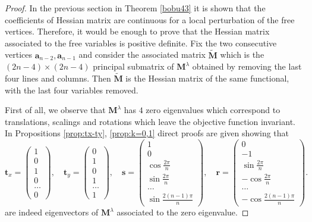 \documentclass[11pt]{article}
\numberwithin{equation}{section}\newtheorem*{jepEnonce}{\jepEnonceTitle}\newenvironment{enonce*}[1]{\def\jepEnonceTitle{#1}\jepEnonce}{\endjepEnonce}\newtheorem*{conj*}{Conjecture}
\theoremstyle{plain}
\theoremstyle{definition}
\newcommand{\bo}[1]{{\boldsymbol#1}}
\begin{document}
\begin{proof} In the previous section in Theorem \ref{bobu43} it is shown that the coefficients of Hessian matrix are continuous for a local perturbation of the free vertices. Therefore, it would be enough to prove that the Hessian matrix associated to the free variables is positive definite. Fix the two consecutive vertices $\bo a_{n-2},\bo a_{n-1}$ and consider the associated matrix $\widetilde{\bo{M}}$ which is the $(2n-4)\times(2n-4)$ principal submatrix of $\bo M^\lambda$ obtained by removing the last four lines and columns. Then $\widetilde{\bo{M}}$ is the Hessian matrix of the same functional, with the last four variables removed.

First of all, we observe that $\bo M^\lambda$ has $4$ zero eigenvalues which correspond to translations, scalings and rotations which leave the objective function invariant. In Propositions \ref{prop:tx-ty}, \ref{prop:k=0,1} direct proofs are given showing that
\begin{equation}\bo t_x= \begin{pmatrix} 1\\0\\1\\0\\ \dots\\0\end{pmatrix},\quad \bo t_y= \begin{pmatrix} 0\\1\\0\\1\\ \dots\\1 \end{pmatrix},\quad \bo s=\begin{pmatrix} 1\\ 0\\ \cos\frac {2\pi}{n} \\ \sin\frac {2\pi}{n}\\ \dots\\\sin \frac{2(n-1) \pi}{n} \end{pmatrix}, \quad\bo r=\begin{pmatrix} 0\\-1\\\sin \frac{2 \pi}{n} \\- \cos\frac {2\pi}{n} \\ \dots\\ -\cos \frac{2(n-1) \pi}{n} \end{pmatrix}.
\label{eq:eigenvectors-zero}
\end{equation}
are indeed eigenvectors of $\bo M^\lambda$ associated to the zero eigenvalue.


\end{proof}
\end{document}
